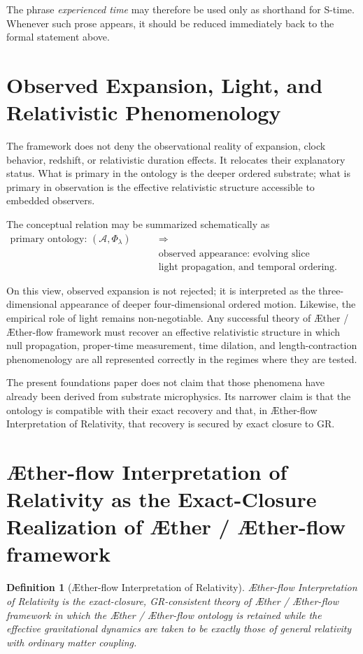 \documentclass[11pt]{article}
\newcommand{\Aether}{\AE{}ther}
\newcommand{\Aflow}{\AE{}ther-flow}
\newcommand{\TheoryName}{\Aflow{} Interpretation of Relativity}
\newcommand{\TheoryProgram}{\Aether{} / \Aflow{} framework}
\newcommand{\Sub}{\mathcal{A}}
\newtheorem{definition}{Definition}
\begin{document}
The phrase \emph{experienced time} may therefore be used only as shorthand for S-time. Whenever such prose appears, it should be reduced immediately back to the formal statement above.

\section{Observed Expansion, Light, and Relativistic Phenomenology}

The framework does not deny the observational reality of expansion, clock behavior, redshift, or relativistic duration effects. It relocates their explanatory status. What is primary in the ontology is the deeper ordered substrate; what is primary in observation is the effective relativistic structure accessible to embedded observers.

The conceptual relation may be summarized schematically as
\[
\begin{aligned}
\text{primary ontology: } (\Sub,\Phi_{\lambda})
\qquad &\Longrightarrow \\
&\text{observed appearance: evolving slice geometry,} \\
&\text{light propagation, and temporal ordering}.
\end{aligned}
\]

On this view, observed expansion is not rejected; it is interpreted as the three-dimensional appearance of deeper four-dimensional ordered motion. Likewise, the empirical role of light remains non-negotiable. Any successful theory of \TheoryProgram{} must recover an effective relativistic structure in which null propagation, proper-time measurement, time dilation, and length-contraction phenomenology are all represented correctly in the regimes where they are tested.

The present foundations paper does not claim that those phenomena have already been derived from substrate microphysics. Its narrower claim is that the ontology is compatible with their exact recovery and that, in \TheoryName{}, that recovery is secured by exact closure to GR.

\section{\TheoryName{} as the Exact-Closure Realization of \TheoryProgram{}}

\begin{definition}[\TheoryName{}]
\TheoryName{} is the exact-closure, GR-consistent theory of \TheoryProgram{} in which the \Aether{} / \Aflow{} ontology is retained while the effective gravitational dynamics are taken to be exactly those of general relativity with ordinary matter coupling.
\end{definition}
\end{document}
